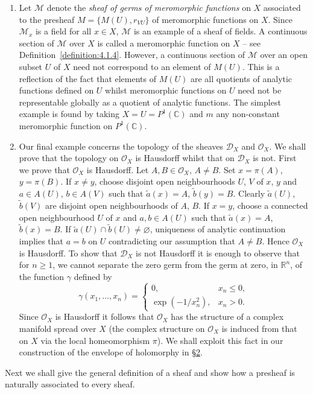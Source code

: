 \begin{enumerate}[start=9]
\item Let $\mathcal M$ denote the \emph{sheaf of germs of meromorphic functions} on $X$ associated to the presheaf $M=\{M(U),r_{VU}\}$ of meromorphic functions on $X$. Since $\mathcal M_x$ is a field for all $x\in X$, $\mathcal M$ is an example of a sheaf of fields. A continuous section of $\mathcal M$ over $X$ is called a meromorphic function on $X$ -- see Definition~\ref{definition:4.1.4}. However, a continuous section of $\mathcal M$ over an open subset $U$ of $X$ need not correspond to an element of $M(U)$. This is a reflection of the fact that elements of $M(U)$ are all quotients of analytic functions defined on $U$ whilst meromorphic functions on $U$ need not be representable globally as a quotient of analytic functions. The simplest example is found by taking $X=U=P^1(\mathbb C)$ and $m$ any non-constant meromorphic function on $P^1(\mathbb C)$.
\item Our final example concerns the topology of the sheaves $\mathcal D_X$ and $\mathcal O_X$. We shall prove that the topology on $\mathcal O_X$ is Hausdorff whilst that on $\mathcal D_X$ is not. First we prove that $\mathcal O_X$ is Hausdorff. Let $A,B\in\mathcal O_X$, $A\ne B$. Set $x=\pi(A)$, $y=\pi(B)$. If $x\ne y$, choose disjoint open neighbourhoods $U$, $V$ of $x$, $y$ and $a\in A(U)$, $b\in A(V)$ such that $\widetilde a(x)=A$, $\widetilde b(y)=B$. Clearly $\widetilde a(U)$, $\widetilde b(V)$ are disjoint open neighbourhoods of $A$, $B$. If $x=y$, choose a connected open neighbourhood $U$ of $x$ and $a,b\in A(U)$ such that $\widetilde a(x)=A$, $\widetilde b(x)=B$. If $\widetilde a(U)\cap\widetilde b(U)\ne\varnothing$, uniqueness of analytic continuation implies that $a=b$ on $U$ contradicting our assumption that $A\ne B$. Hence $\mathcal O_X$ is Hausdorff. To show that $\mathcal D_X$ is not Hausdorff it is enough to observe that for $n\geq1$, we cannot separate the zero germ from the germ at zero, in $\mathbb R^n$, of the function $\gamma$ defined by
\[
\gamma(x_1,\ldots,x_n)=\begin{cases}0,&x_n\leq0,\\ \exp(-1/x_n^2),&x_n>0.\end{cases}
\]
Since $\mathcal O_X$ is Hausdorff it follows that $\mathcal O_X$ has the structure of a complex manifold spread over $X$ (the complex structure on $\mathcal O_X$ is induced from that on $X$ via the local homeomorphism $\pi$). We shall exploit this fact in our construction of the envelope of holomorphy in \hyperref[sec:6:2]{\S2}.
\end{enumerate}
Next we shall give the general definition of a sheaf and show how a presheaf is naturally associated to every sheaf.


